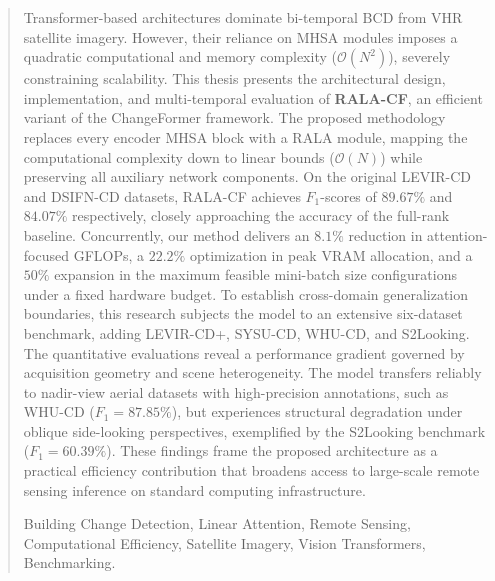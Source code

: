 \begin{abstract}
Transformer-based architectures dominate bi-temporal \ac{BCD} from \ac{VHR} satellite imagery. However, their reliance on \ac{MHSA} modules imposes a quadratic computational and memory complexity ($\mathcal{O}(N^2)$), severely constraining scalability. This thesis presents the architectural design, implementation, and multi-temporal evaluation of \textbf{\ac{RALA-CF}}, an efficient variant of the ChangeFormer framework. The proposed methodology replaces every encoder \ac{MHSA} block with a \ac{RALA} module, mapping the computational complexity down to linear bounds ($\mathcal{O}(N)$) while preserving all auxiliary network components. On the original LEVIR-CD and DSIFN-CD datasets, \ac{RALA-CF} achieves $F_1$-scores of $89.67\%$ and $84.07\%$ respectively, closely approaching the accuracy of the full-rank baseline. Concurrently, our method delivers an $8.1\%$ reduction in attention-focused \ac{GFLOPs}, a $22.2\%$ optimization in peak \ac{VRAM} allocation, and a $50\%$ expansion in the maximum feasible mini-batch size configurations under a fixed hardware budget. To establish cross-domain generalization boundaries, this research subjects the model to an extensive six-dataset benchmark, adding LEVIR-CD+, SYSU-CD, WHU-CD, and S2Looking. The quantitative evaluations reveal a performance gradient governed by acquisition geometry and scene heterogeneity. The model transfers reliably to nadir-view aerial datasets with high-precision annotations, such as WHU-CD ($F_1 = 87.85\%$), but experiences structural degradation under oblique side-looking perspectives, exemplified by the S2Looking benchmark ($F_1 = 60.39\%$). These findings frame the proposed architecture as a practical efficiency contribution that broadens access to large-scale remote sensing inference on standard computing infrastructure.

\vspace{0.8cm}
 Building Change Detection, Linear Attention, Remote Sensing, Computational Efficiency, Satellite Imagery, Vision Transformers, Benchmarking.
\end{abstract}
